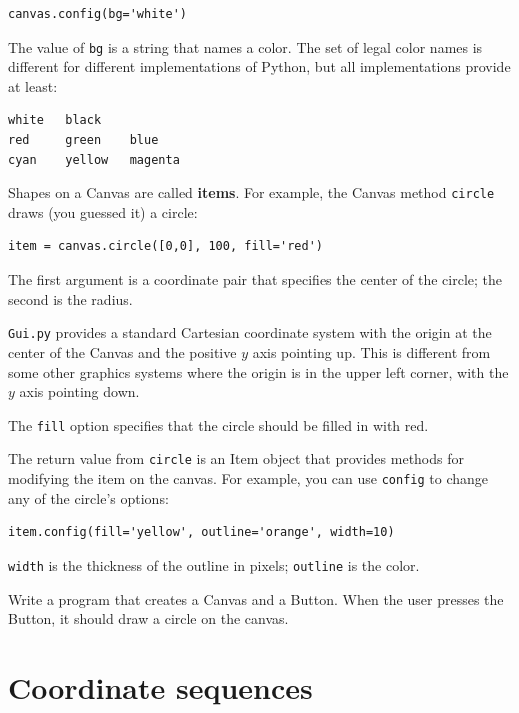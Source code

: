 \documentclass[10pt]{book}
\begin{document}
\beforeverb
\begin{verbatim}
canvas.config(bg='white')
\end{verbatim}
\afterverb
%
The value of {\tt bg} is a string
that names a color.  The set of legal color names is different
for different implementations of Python, but all implementations
provide at least:

\beforeverb
\begin{verbatim}
white   black
red     green    blue   
cyan    yellow   magenta
\end{verbatim}
\afterverb
%
Shapes on a Canvas are called {\bf items}.  For example,
the Canvas method {\tt circle} draws (you guessed it) a circle:


\beforeverb
\begin{verbatim}
item = canvas.circle([0,0], 100, fill='red')
\end{verbatim}
\afterverb
%
The first argument is a coordinate pair that specifies the
center of the circle; the second is the radius.


{\tt Gui.py} provides a standard Cartesian coordinate system with
the origin at the center of the Canvas and the positive $y$ axis
pointing up.  This is different from some other graphics systems
where the origin is in the upper left corner, with the $y$ axis
pointing down.

The {\tt fill} option specifies that the circle should be filled
in with red.

The return value from {\tt circle} is an Item object that
provides methods for modifying the item on the canvas.  For
example, you can use {\tt config} to change any of the circle's
options:

\beforeverb
\begin{verbatim}
item.config(fill='yellow', outline='orange', width=10)
\end{verbatim}
\afterverb
%
{\tt width} is the thickness of the outline in pixels;
{\tt outline} is the color.

\begin{ex}
\label{circle}
Write a program that creates a Canvas and a Button.  When the
user presses the Button, it should draw a circle on the canvas.
\end{ex}


\section{Coordinate sequences}
\end{document}
